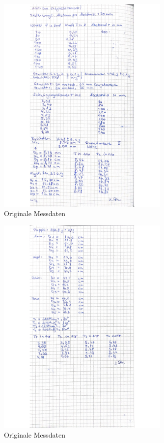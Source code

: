 \begin{figure}
  \centering
  \includegraphics[width=0.75\textwidth]{Bilder/daten1.jpg}
  \caption{Originale Messdaten}
  \label{fig:daten1}
\end{figure}

\begin{figure}
  \centering
  \includegraphics[width=0.75\textwidth]{Bilder/daten2.jpg}
  \caption{Originale Messdaten}
  \label{fig:daten2}
\end{figure}